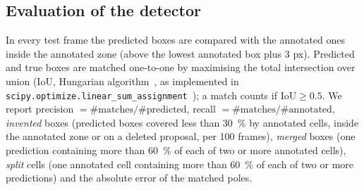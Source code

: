 \documentclass[11pt,a4paper]{article}
\begin{document}
\subsection{Evaluation of the detector}\label{sec:det_eval}
In every test frame the predicted boxes are compared with the annotated ones inside the annotated zone (above the lowest annotated box plus 3 px). Predicted and true boxes are matched one-to-one by maximising the total intersection over union (IoU, Hungarian algorithm~\cite{kuhn1955}, as implemented in \texttt{scipy.optimize.\allowbreak linear\_\allowbreak sum\_\allowbreak assignment}~\cite{crouse2016,virtanen2020}); a match counts if $\mathrm{IoU}\ge0.5$. We report precision $=\#\text{matches}/\#\text{predicted}$, recall $=\#\text{matches}/\#\text{annotated}$, \emph{invented} boxes (predicted boxes covered less than \SI{30}{\percent} by annotated cells, inside the annotated zone or on a deleted proposal, per 100 frames), \emph{merged} boxes (one prediction containing more than \SI{60}{\percent} of each of two or more annotated cells), \emph{split} cells (one annotated cell containing more than \SI{60}{\percent} of each of two or more predictions) and the absolute error of the matched poles.
\end{document}
